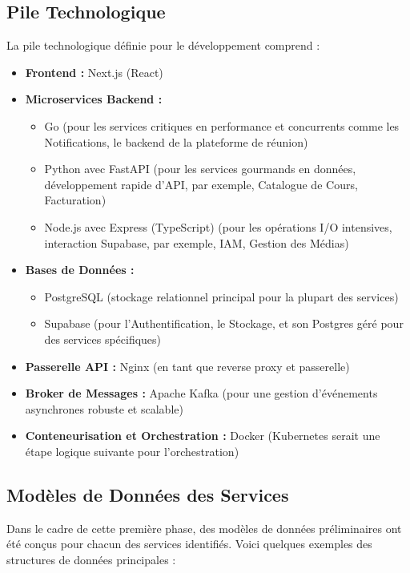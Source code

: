 \subsection{Pile Technologique}
La pile technologique définie pour le développement comprend :
\begin{itemize}
  \item \textbf{Frontend :} Next.js (React)
  \item \textbf{Microservices Backend :}
    \begin{itemize}
      \item Go (pour les services critiques en performance et concurrents comme les Notifications, le backend de la plateforme de réunion)
      \item Python avec FastAPI (pour les services gourmands en données, développement rapide d'API, par exemple, Catalogue de Cours, Facturation)
      \item Node.js avec Express (TypeScript) (pour les opérations I/O intensives, interaction Supabase, par exemple, IAM, Gestion des Médias)
    \end{itemize}
  \item \textbf{Bases de Données :}
    \begin{itemize}
      \item PostgreSQL (stockage relationnel principal pour la plupart des services)
      \item Supabase (pour l'Authentification, le Stockage, et son Postgres géré pour des services spécifiques)
    \end{itemize}
  \item \textbf{Passerelle API :} Nginx (en tant que reverse proxy et passerelle)
  \item \textbf{Broker de Messages :} Apache Kafka (pour une gestion d'événements asynchrones robuste et scalable)
  \item \textbf{Conteneurisation et Orchestration :} Docker (Kubernetes serait une étape logique suivante pour l'orchestration)
\end{itemize}

\subsection{Modèles de Données des Services}
Dans le cadre de cette première phase, des modèles de données préliminaires ont été conçus pour chacun des services identifiés. Voici quelques exemples des structures de données principales :

\newpage
